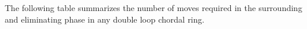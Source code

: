  The following table summarizes the number of moves required in the surrounding and eliminating phase in any double loop chordal ring.

